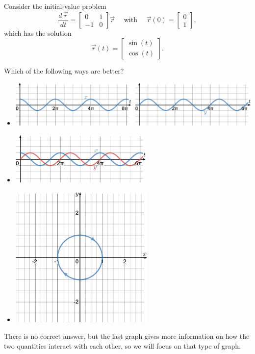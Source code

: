 \begin{example}
Consider the initial-value problem
$$
\frac{d\,\vec{r}}{dt} = \begin{bmatrix} 0 & 1 \\ -1 & 0 \end{bmatrix}\vec{r} \quad \text{ with } \quad \vec{r}(0)=\begin{bmatrix} 0 \\ 1 \end{bmatrix},
$$
which has the solution
$$
\vec{r}(t) = \begin{bmatrix}
	\sin(t) \\ \cos(t)
\end{bmatrix}.
$$

Which of the following ways are better?
\begin{itemize}
\item \begin{minipage}{400pt}\includegraphics[width=400pt]{images/module17-sep-xy.pdf}\end{minipage}

\item \begin{minipage}{200pt}\includegraphics*[width=200pt]{images/module17-together-xy.pdf}\end{minipage}

\item \begin{minipage}{200pt}\includegraphics[height=200pt]{images/module17-phaseportrait.pdf}\end{minipage}
\end{itemize}

There is no correct answer, but the last graph gives more information on how the two quantities interact with each other, so we will focus on that type of graph.
\end{example}


